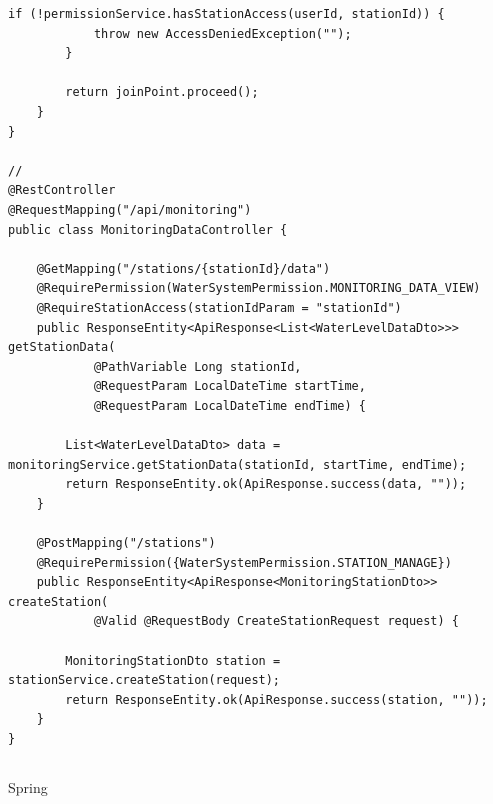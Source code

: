 \begin{lstlisting}[style=java]
        if (!permissionService.hasStationAccess(userId, stationId)) {
            throw new AccessDeniedException("");
        }
        
        return joinPoint.proceed();
    }
}

// 
@RestController
@RequestMapping("/api/monitoring")
public class MonitoringDataController {
    
    @GetMapping("/stations/{stationId}/data")
    @RequirePermission(WaterSystemPermission.MONITORING_DATA_VIEW)
    @RequireStationAccess(stationIdParam = "stationId")
    public ResponseEntity<ApiResponse<List<WaterLevelDataDto>>> getStationData(
            @PathVariable Long stationId,
            @RequestParam LocalDateTime startTime,
            @RequestParam LocalDateTime endTime) {
        
        List<WaterLevelDataDto> data = monitoringService.getStationData(stationId, startTime, endTime);
        return ResponseEntity.ok(ApiResponse.success(data, ""));
    }
    
    @PostMapping("/stations")
    @RequirePermission({WaterSystemPermission.STATION_MANAGE})
    public ResponseEntity<ApiResponse<MonitoringStationDto>> createStation(
            @Valid @RequestBody CreateStationRequest request) {
        
        MonitoringStationDto station = stationService.createStation(request);
        return ResponseEntity.ok(ApiResponse.success(station, ""));
    }
}
\end{lstlisting}

\hypertarget{section-79}{%
\subsection{}\label{section-79}}

\hypertarget{section-80}{%
\subsubsection{}\label{section-80}}

Spring

